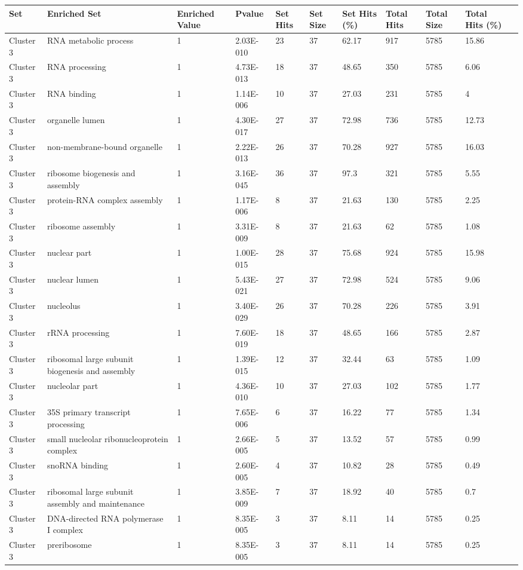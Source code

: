 \begin{tabular}{|l|l|l|l|l|l|l|l|l|l|l|}
\hline
Set&Enriched Set&Enriched Value&Pvalue&Set Hits&Set Size&Set Hits (\%)&Total Hits&Total Size&Total Hits (\%)&\\
\hline
Cluster 3&RNA metabolic process&1&2.03E-010&23&37&62.17&917&5785&15.86&\\
\hline
Cluster 3&RNA processing&1&4.73E-013&18&37&48.65&350&5785&6.06&\\
\hline
Cluster 3&RNA binding&1&1.14E-006&10&37&27.03&231&5785&4&\\
\hline
Cluster 3&organelle lumen&1&4.30E-017&27&37&72.98&736&5785&12.73&\\
\hline
Cluster 3&non-membrane-bound organelle&1&2.22E-013&26&37&70.28&927&5785&16.03&\\
\hline
Cluster 3&ribosome biogenesis and assembly&1&3.16E-045&36&37&97.3&321&5785&5.55&\\
\hline
Cluster 3&protein-RNA complex assembly&1&1.17E-006&8&37&21.63&130&5785&2.25&\\
\hline
Cluster 3&ribosome assembly&1&3.31E-009&8&37&21.63&62&5785&1.08&\\
\hline
Cluster 3&nuclear part&1&1.00E-015&28&37&75.68&924&5785&15.98&\\
\hline
Cluster 3&nuclear lumen&1&5.43E-021&27&37&72.98&524&5785&9.06&\\
\hline
Cluster 3&nucleolus&1&3.40E-029&26&37&70.28&226&5785&3.91&\\
\hline
Cluster 3&rRNA processing&1&7.60E-019&18&37&48.65&166&5785&2.87&\\
\hline
Cluster 3&ribosomal large subunit biogenesis and assembly&1&1.39E-015&12&37&32.44&63&5785&1.09&\\
\hline
Cluster 3&nucleolar part&1&4.36E-010&10&37&27.03&102&5785&1.77&\\
\hline
Cluster 3&35S primary transcript processing&1&7.65E-006&6&37&16.22&77&5785&1.34&\\
\hline
Cluster 3&small nucleolar ribonucleoprotein complex&1&2.66E-005&5&37&13.52&57&5785&0.99&\\
\hline
Cluster 3&snoRNA binding&1&2.60E-005&4&37&10.82&28&5785&0.49&\\
\hline
Cluster 3&ribosomal large subunit assembly and maintenance&1&3.85E-009&7&37&18.92&40&5785&0.7&\\
\hline
Cluster 3&DNA-directed RNA polymerase I complex&1&8.35E-005&3&37&8.11&14&5785&0.25&\\
\hline
Cluster 3&preribosome&1&8.35E-005&3&37&8.11&14&5785&0.25&\\

\end{tabular}
